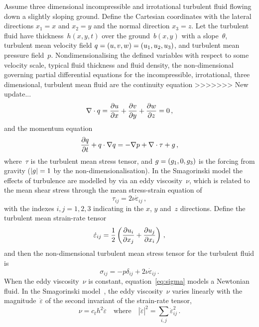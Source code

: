 \documentclass[twocolumn]{afmc_art}
\newcommand{\ros}{{\dot\varepsilon}}
\renewcommand{\vec}[1]{\text{\boldmath$#1$}}
\begin{document}
Assume three dimensional incompressible and irrotational turbulent fluid flowing down a slightly sloping ground. 
Define the Cartesian coordinates with the lateral directions $x_1=x$ and $x_2=y$ and the normal direction $x_3=z$. 
Let the turbulent fluid have thickness~$h(x,y,t)$ over the ground~$b(x,y)$ with a slope~$\theta$, turbulent mean velocity field $\vec q=(u,v,w)=(u_1,u_2,u_3)$, and turbulent mean pressure field~$p$.
Nondimensionalising the defined variables with respect to some velocity scale, typical fluid thickness and fluid density, the non-dimensional governing partial differential equations for the incompressible, irrotational, three dimensional, turbulent mean fluid are the continuity equation
>>>>>>> New update...
\begin{equation}
    \divv\vec q=\D xu+\D yv+\D zw=0\,,\label{eq:cont}
\end{equation}
and the momentum equation
\begin{equation}
    \D t{\vec q} +\vec q\cdot\grad\vec q
    =-\grad p +\divv\tau +\vec{g}\,,\label{eq:mom}
\end{equation}
where~$\tau$ is the turbulent mean stress tensor, and $\vec g=(g_1,0,g_3)$ is the forcing from gravity ($|\vec g|=1$ by the non-dimensionalisation).
In the Smagorinski model the effects of turbulence are modelled by via an eddy viscosity~$\nu$, which is related to the mean shear stress through the mean stress-strain equation of
\begin{equation}
\tau_{ij}=2\nu\ros_{ij}\,,\label{eq:tau}
\end{equation}
with the indexes $i,j=1,2,3$ indicating in the $x$, $y$ and~$z$ directions.
Define the turbulent mean strain-rate tensor~\cite[e.g.]{Roberts2008,Georgiev2008}
\begin{equation}
	\ros_{ij} =\frac12\left( \D{x_j}{u_i} +\D{x_i}{u_j}\right) \,,\label{eq:strainrate}
\end{equation}
and then the non-dimensional turbulent mean stress tensor for the turbulent fluid is
\begin{equation}
\sigma_{ij}=-p\delta_{ij}+2\nu\ros_{ij}\,.\label{eq:sigma}
\end{equation}
When the eddy viscosity~$\nu$ is constant, equation~\eqref{eq:sigma} models a Newtonian fluid.
In the Smagorinski model~\cite[e.g.]{Ozgokmen2007a}, the eddy viscosity~$\nu$ varies linearly with the magnitude~$\ros$ of the second invariant of the strain-rate tensor,
\begin{equation}
  \nu=c_th^2\ros\quad\text{where}\quad |\ros|^2=\sum_{i,j}\ros_{ij}^2\,.\label{eq:nu}
\end{equation}
\end{document}
